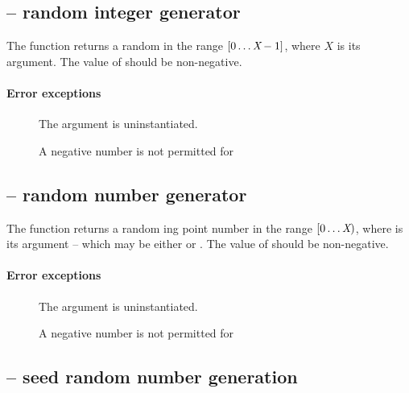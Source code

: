 \subsection{ -- random integer generator}
\label{arith:irand}

The  function returns a random  in the range $[0\ldots{\mbox{\rm\em X}}-1]$, where $X$ is its argument. The value of  should be non-negative.
        
\paragraph{Error exceptions}
\begin{description}
\item[]
The argument is uninstantiated.
\item[]
A negative number is not permitted for 
\end{description}

\subsection{ -- random number generator}
\label{arith:rand}

The  function returns a random ing point number in the range $[0\ldots{\mbox{\rm\em X}})$, where  is its argument -- which may be either  or . The value of  should be non-negative.
        
\paragraph{Error exceptions}
\begin{description}
\item[]
The argument is uninstantiated.
\item[]
A negative number is not permitted for 
\end{description}

\subsection{ -- seed random number generation}
\label{arith:srand}

     
